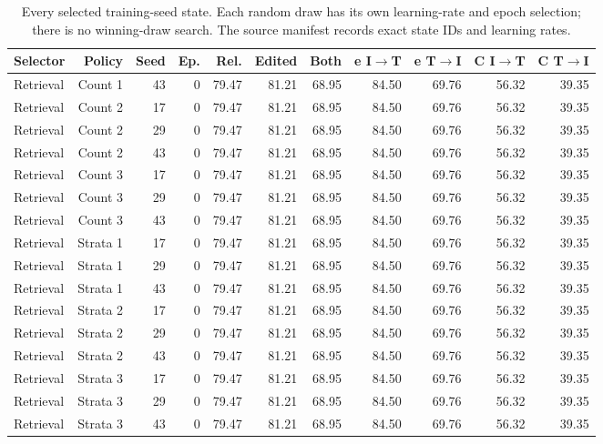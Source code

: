 \begin{table}[t]
\nolinenumbers
\centering
\small
\setlength{\tabcolsep}{3pt}
\begin{tabular}{lrrrrrrrrrr}
\toprule
Selector & Policy & Seed & Ep. & Rel. & Edited & Both & e I$\to$T & e T$\to$I & C I$\to$T & C T$\to$I\\
\midrule
Retrieval & Count 1 & 43 & 0 & 79.47 & 81.21 & 68.95 & 84.50 & 69.76 & 56.32 & 39.35\\
Retrieval & Count 2 & 17 & 0 & 79.47 & 81.21 & 68.95 & 84.50 & 69.76 & 56.32 & 39.35\\
Retrieval & Count 2 & 29 & 0 & 79.47 & 81.21 & 68.95 & 84.50 & 69.76 & 56.32 & 39.35\\
Retrieval & Count 2 & 43 & 0 & 79.47 & 81.21 & 68.95 & 84.50 & 69.76 & 56.32 & 39.35\\
Retrieval & Count 3 & 17 & 0 & 79.47 & 81.21 & 68.95 & 84.50 & 69.76 & 56.32 & 39.35\\
Retrieval & Count 3 & 29 & 0 & 79.47 & 81.21 & 68.95 & 84.50 & 69.76 & 56.32 & 39.35\\
Retrieval & Count 3 & 43 & 0 & 79.47 & 81.21 & 68.95 & 84.50 & 69.76 & 56.32 & 39.35\\
Retrieval & Strata 1 & 17 & 0 & 79.47 & 81.21 & 68.95 & 84.50 & 69.76 & 56.32 & 39.35\\
Retrieval & Strata 1 & 29 & 0 & 79.47 & 81.21 & 68.95 & 84.50 & 69.76 & 56.32 & 39.35\\
Retrieval & Strata 1 & 43 & 0 & 79.47 & 81.21 & 68.95 & 84.50 & 69.76 & 56.32 & 39.35\\
Retrieval & Strata 2 & 17 & 0 & 79.47 & 81.21 & 68.95 & 84.50 & 69.76 & 56.32 & 39.35\\
Retrieval & Strata 2 & 29 & 0 & 79.47 & 81.21 & 68.95 & 84.50 & 69.76 & 56.32 & 39.35\\
Retrieval & Strata 2 & 43 & 0 & 79.47 & 81.21 & 68.95 & 84.50 & 69.76 & 56.32 & 39.35\\
Retrieval & Strata 3 & 17 & 0 & 79.47 & 81.21 & 68.95 & 84.50 & 69.76 & 56.32 & 39.35\\
Retrieval & Strata 3 & 29 & 0 & 79.47 & 81.21 & 68.95 & 84.50 & 69.76 & 56.32 & 39.35\\
Retrieval & Strata 3 & 43 & 0 & 79.47 & 81.21 & 68.95 & 84.50 & 69.76 & 56.32 & 39.35\\
\bottomrule
\end{tabular}
\caption{Every selected training-seed state. Each random draw has its own learning-rate and epoch selection; there is no winning-draw search. The source manifest records exact state IDs and learning rates.}\label{tab:fusel2}
\end{table}
